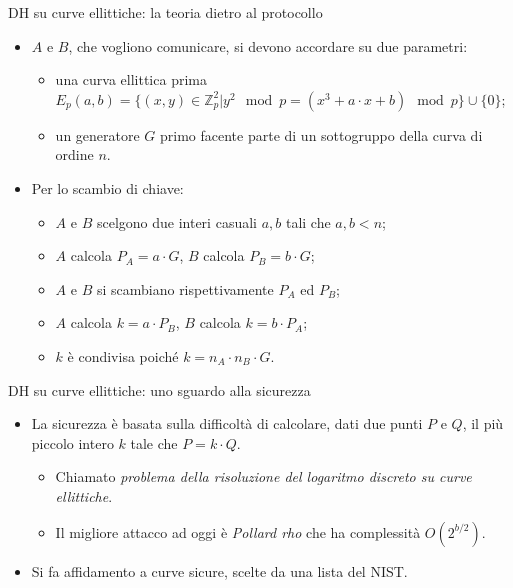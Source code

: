 \documentclass[11pt,svgnames,smaller,aspectratio=169,italian]{beamer}
\begin{document}
\begin{frame}{DH su curve ellittiche: la teoria dietro al protocollo}
	\begin{itemize}
		\item $A$ e $B$, che vogliono comunicare, si devono accordare su due parametri:
			\begin{itemize}
				\item una curva ellittica prima $E_{p}(a, b) = \{(x, y) \in \mathds{Z}_{p}^{2} | y^{2} \mod p = (x^{3} + a \cdot x + b) \mod p \} \cup \{0\}$;
				\item un generatore $G$ primo facente parte di un sottogruppo della curva di ordine $n$.
			\end{itemize}
		\item Per lo scambio di chiave:
			\begin{itemize}
				\item $A$ e $B$ scelgono due interi casuali $a, b$ tali che $a, b < n$;
				\item $A$ calcola $P_{A} = a \cdot G$, $B$ calcola $P_{B} = b \cdot G$;
				\item $A$ e $B$ si scambiano rispettivamente $P_{A}$ ed $P_{B}$;
				\item $A$ calcola $k = a \cdot P_{B}$, $B$ calcola $k = b \cdot P_{A}$;
				\item $k$ è condivisa poiché $k = n_{A} \cdot n_{B} \cdot G$.
			\end{itemize}
	\end{itemize}
\end{frame}

\begin{frame}{DH su curve ellittiche: uno sguardo alla sicurezza}
	\begin{itemize}
		\item La sicurezza è basata sulla difficoltà di calcolare, dati due punti $P$ e $Q$, il più piccolo intero $k$ tale che $P = k \cdot Q$.
			\begin{itemize}
				\item Chiamato \emph{problema della risoluzione del logaritmo discreto su curve ellittiche}.
				\item Il migliore attacco ad oggi è \emph{Pollard rho} che ha complessità $O(2^{b/2})$.
			\end{itemize}
		\item Si fa affidamento a curve sicure, scelte da una lista del NIST.
	\end{itemize}
\end{frame}
\end{document}
